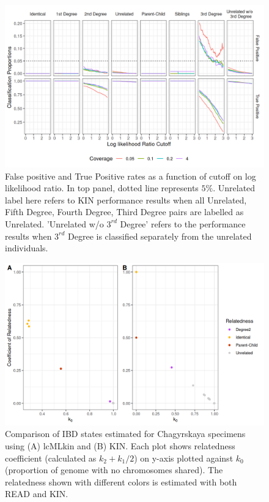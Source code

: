 \documentclass[12pt, letterpaper]{article}
\begin{document}
\begin{figure}[h!]
    \includegraphics[width=16cm]{plots/plotimg/contam0_inbred0_model_performance_allroc_asc0_plot.png}
    \centering
    \caption{False positive and True Positive rates as a function of cutoff on log likelihood ratio. In top panel, dotted line represents $5\%$. Unrelated label here refers to KIN performance results when all Unrelated, Fifth Degree, Fourth Degree, Third Degree pairs are labelled as Unrelated. 'Unrelated w/o $3^{rd}$ Degree' refers to the performance results when $3^{rd}$ Degree is classified separately from the unrelated individuals.}
    \label{figS10:cutoff}
\end{figure}



\begin{figure}[h!]
    \centering
    \includegraphics[width=18cm]{supplementary_info/plots/lcPlot.png}
    \caption{Comparison of IBD states estimated for Chagyrskaya specimens using (A) lcMLkin and (B) KIN. Each plot shows relatedness coefficient (calculated as $k_2+k_1/2$) on y-axis plotted against $k_0$ (proportion of genome with no chromosomes shared).
    The relatedness shown with different colors is estimated with both READ and KIN.}
    \label{figS6:Chagyrskaya_ibd}
\end{figure}
\end{document}
